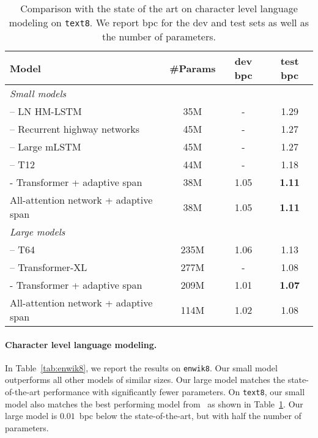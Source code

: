 \documentclass{article}
\newcommand{\tab}[1]{Table~\ref{tab:#1}}
\begin{document}
\begin{table}[t]
\centering
\caption{
  Comparison with the state of the art on character level language modeling on \texttt{text8}.
  We report bpc for the dev and test sets as well as the number of parameters.
}
\label{tab:text8}
\begin{tabular}{lccc}
  \toprule
  Model & \#Params & dev bpc & test bpc \\
  \midrule
  \multicolumn{4}{l}{\emph{Small models}}\\
\citet{chung2016hierarchical} – LN HM-LSTM& 35M & - & 1.29\\
\citet{zilly2017recurrent} – Recurrent highway networks & 45M & - & 1.27\\
\citet{krause2016multiplicative} – Large mLSTM& 45M & - & 1.27\\
\citet{al2018character} – T12 & 44M  & - & 1.18\\
  \citet{sukhbaatar2019adaptive} - Transformer + adaptive span & 38M  & 1.05 & \bf 1.11 \\
  All-attention network + adaptive span                       & 38M & 1.05 & \bf 1.11 \\
  \midrule
  \multicolumn{4}{l}{\emph{Large models}}\\
  \citet{al2018character} – T64 & 235M  & 1.06 & 1.13\\
  \citet{dai2019transformer} – Transformer-XL & 277M & - & 1.08\\
  \citet{sukhbaatar2019adaptive} - Transformer  + adaptive span   & 209M  & 1.01 & \bf 1.07 \\
  All-attention network + adaptive span                       & 114M & 1.02 & 1.08 \\
  \bottomrule
\end{tabular}
\end{table}

\paragraph{Character level language modeling.}
In \tab{enwik8}, we report the results on \texttt{enwik8}.
Our small model outperforms all other models of similar sizes.
Our large model matches the state-of-the-art performance with significantly fewer parameters.
On \texttt{text8}, our small model also matches the best performing model from~\citet{sukhbaatar2019adaptive} as shown in \tab{text8}.
Our large model is $0.01$~bpc below the state-of-the-art, but with half the number of parameters.
\end{document}
